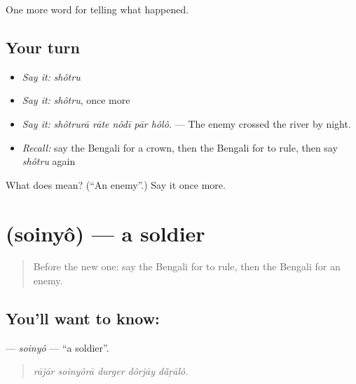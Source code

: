\begin{grammarlens}[title={What you've built}]
One more word for telling what happened.
\end{grammarlens}

\subsection*{Your turn}
\begin{itemize}
\raggedright
  \item \emph{Say it:} \emph{shôtru}
  \item \emph{Say it:} \emph{shôtru}, once more
  \item \emph{Say it:} \emph{shôtrurā rāte nôdī pār hôlô.} — The enemy crossed the river by night.
  \item \emph{Recall:} say the Bengali for a crown, then the Bengali for to rule, then say \emph{shôtru} again
\end{itemize}

\begin{tcolorbox}[breakable,colback=teal!4,colframe=teal!35!black,title={Before you move on}]
What does  mean? (\textquotedblleft{}An enemy\textquotedblright{}.) Say it once more.
\end{tcolorbox}
\section[\texorpdfstring{\bn{সৈন্য} (soinyô)}{সৈন্য (soinyô)}]{ (soinyô) — a soldier}

\label{lesson:BN-C314-soinyo}



\begin{quote}
Before the new one: say the Bengali for to rule, then the Bengali for an enemy.
\end{quote}

\subsection*{You'll want to know: }
\textbf{} — \emph{soinyô} — \textquotedblleft{}a soldier\textquotedblright{}.

\begin{quote}
    
\end{quote}

\begin{quote}
\emph{rājār soinyôrā durger dôrjāy dā̃ṛālô.}
\end{quote}

